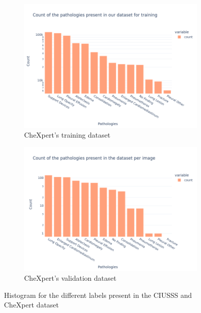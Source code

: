 \documentclass[11pt]{article}
\begin{document}
\begin{figure}[h!]
         \begin{subfigure}[b]{0.48\linewidth}
             \centering
             \includegraphics[width=\linewidth]{plots/histogram_chexpert_train}
             \caption{CheXpert's training dataset}
             \vspace{4ex}
             \label{fig:histogram_chexpert_train}
         \end{subfigure}
         \hfill
         \begin{subfigure}[b]{0.48\linewidth}
             \centering
             \includegraphics[width=\linewidth]{plots/histogram_chexpert_valid}
             \caption{CheXpert's validation dataset}
             \vspace{4ex}
             \label{fig:histogram_chexpert_valid}
         \end{subfigure}

         \caption{Histogram for the different labels present in the CIUSSS and CheXpert dataset}
         \label{fig:histogram_classes}
    \end{figure}
\newpage
\end{document}
